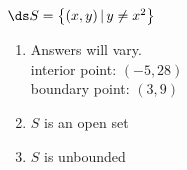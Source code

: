 {$\ds S = \left\{(x,y)\,| \, y\neq x^2\right\}$}
{\begin{enumerate}
\item Answers will vary.\\
interior point: $(-5,28)$\\
boundary point: $(3,9)$\\
\item $S$ is an open set\\
\item $S$ is unbounded
\end{enumerate}
}
